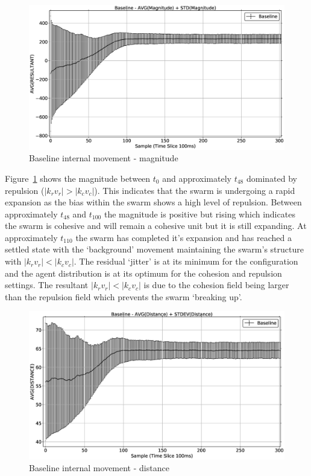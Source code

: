 \begin{figure}[H]
\begin{center}
\includegraphics[width=14cm]{CHAPTER-6/figures/BaselineMagnitude1}
\end{center}
\caption{Baseline internal movement - magnitude\label{coord:BaselineMagnitude1}}
\end{figure}

Figure~\ref{coord:BaselineMagnitude1} shows the magnitude between $t_0$ and approximately $t_{48}$ dominated by repulsion ($|k_rv_r| > |k_cv_c|$). This indicates that the swarm is undergoing a rapid expansion as the bias within the swarm shows a high level of repulsion. Between approximately $t_{48}$ and $t_{100}$ the magnitude is positive but rising which indicates the swarm is cohesive and will remain a cohesive unit but it is still expanding. At approximately $t_{110}$ the swarm has completed it's expansion and has reached a settled state with the `background' movement maintaining the swarm's structure with $|k_rv_r| < |k_cv_c|$. The residual `jitter' is at its minimum for the configuration and the agent distribution is at its optimum for the cohesion and repulsion settings. The resultant $|k_rv_r| < |k_cv_c|$ is due to the cohesion field being larger than the repulsion field which prevents the swarm `breaking up'. 

\begin{figure}[H]
\begin{center}
\includegraphics[width=14cm]{CHAPTER-6/figures/BaselineDistance1}
\end{center}
\caption{Baseline internal movement - distance\label{coord:BaselineDistance1}}
\end{figure}

